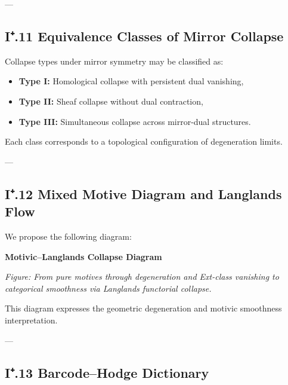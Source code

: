 \documentclass[11pt]{article}
\begin{document}
---

\subsection*{I⁺.11 Equivalence Classes of Mirror Collapse}

Collapse types under mirror symmetry may be classified as:

\begin{itemize}
  \item \textbf{Type I:} Homological collapse with persistent dual vanishing,
  \item \textbf{Type II:} Sheaf collapse without dual contraction,
  \item \textbf{Type III:} Simultaneous collapse across mirror-dual structures.
\end{itemize}

Each class corresponds to a topological configuration of degeneration limits.

---

\subsection*{I⁺.12 Mixed Motive Diagram and Langlands Flow}

We propose the following diagram:

\vspace{1.5em}
\noindent\textbf{Motivic–Langlands Collapse Diagram}

\vspace{0.5em}
\noindent
\begin{minipage}{\textwidth}
\centering
{}
\vspace{0.5em}

\small\textit{Figure: From pure motives through degeneration and Ext-class vanishing to categorical smoothness via Langlands functorial collapse.}
\end{minipage}

This diagram expresses the geometric degeneration and motivic smoothness interpretation.

---

\subsection*{I⁺.13 Barcode–Hodge Dictionary}
\end{document}
